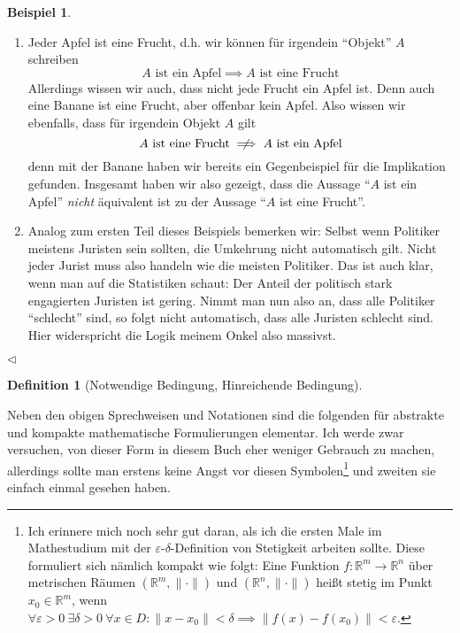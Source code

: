 \documentclass[11pt,reqno, a4paper]{book}
\theoremstyle{mystyle}
\newtheorem{definition}[theorem]{Definition}
\theoremstyle{definition}
\newtheorem{exampleth}[theorem]{Beispiel}
\newenvironment{example}{\begin{exampleth}}{\hspace{\fill}$\triangleleft$\end{exampleth}}
\numberwithin{equation}{chapter}
\begin{document}
\begin{example}
    \begin{enumerate}[label=(\arabic*)]
        \item Jeder Apfel ist eine Frucht, d.h. wir können für irgendein "`Objekt"' \(A\) schreiben 
        \begin{equation*}
            A \text{ ist ein Apfel} \implies A \text{ ist eine Frucht}
        \end{equation*}
        Allerdings wissen wir auch, dass nicht jede Frucht ein Apfel ist. Denn auch eine Banane ist eine Frucht, aber offenbar kein Apfel. Also wissen wir ebenfalls, dass für irgendein Objekt \(A\) gilt 
        \begin{equation*}
            A \text{ ist eine Frucht} \centernot\implies A \text{ ist ein Apfel}
        \end{equation*}
        denn mit der Banane haben wir bereits ein Gegenbeispiel für die Implikation gefunden. Insgesamt haben wir also gezeigt, dass die Aussage "`\(A\) ist ein Apfel"' \textit{nicht} äquivalent ist zu der Aussage "`\(A\) ist eine Frucht"'. 

        \item Analog zum ersten Teil dieses Beispiels bemerken wir: Selbst wenn Politiker meistens Juristen sein sollten, die Umkehrung nicht automatisch gilt. Nicht jeder Jurist muss also handeln wie die meisten Politiker. Das ist auch klar, wenn man auf die Statistiken schaut: Der Anteil der politisch stark engagierten Juristen ist gering. Nimmt man nun also an, dass alle Politiker "`schlecht"' sind, so folgt nicht automatisch, dass alle Juristen schlecht sind. Hier widerspricht die Logik meinem Onkel also massivst. 
    \end{enumerate}
\end{example}

\begin{definition}[Notwendige Bedingung, Hinreichende Bedingung]
    
\end{definition}

Neben den obigen Sprechweisen und Notationen sind die folgenden für abstrakte und kompakte mathematische Formulierungen elementar. Ich werde zwar versuchen, von dieser Form in diesem Buch eher weniger Gebrauch zu machen, allerdings sollte man erstens keine Angst vor diesen Symbolen\footnote{Ich erinnere mich noch sehr gut daran, als ich die ersten Male im Mathestudium mit der \(\varepsilon\)-\(\delta\)-Definition von Stetigkeit arbeiten sollte. Diese formuliert sich nämlich kompakt wie folgt: Eine Funktion \(f:\mathbb R^m\to\mathbb R^n\) über metrischen Räumen \((\mathbb R^m, \|\cdot\|)\) und \((\mathbb R^n, \|\cdot\|)\) heißt stetig im Punkt \(x_0 \in \mathbb R^m\), wenn \(\forall \varepsilon>0 \: \exists \delta >0 \: \forall x \in D: \|x-x_0\|< \delta \implies \|f(x) - f(x_0)\|< \varepsilon\). } und zweiten sie einfach einmal gesehen haben. 
\end{document}
